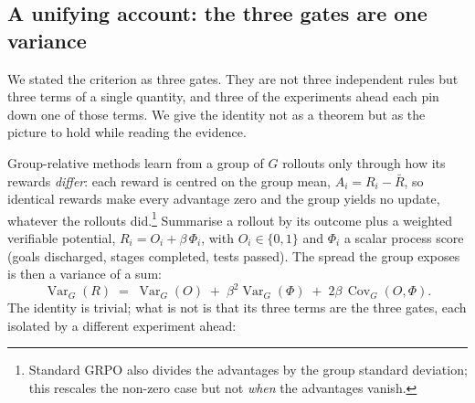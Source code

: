 \subsection{A unifying account: the three gates are one variance}
\label{sec:unifying}

We stated the criterion as three gates. They are not three independent rules but three terms
of a single quantity, and three of the experiments ahead each pin down one of those terms. We
give the identity not as a theorem but as the picture to hold while reading the evidence.

Group-relative methods learn from a group of $G$ rollouts only through how its rewards
\emph{differ}: each reward is centred on the group mean, $A_i = R_i - \bar R$, so identical
rewards make every advantage zero and the group yields no update, whatever the rollouts
did.\footnote{Standard GRPO also divides the advantages by the group standard deviation; this
rescales the non-zero case but not \emph{when} the advantages vanish.} Summarise a rollout by
its outcome plus a weighted verifiable potential, $R_i = O_i + \beta\,\Phi_i$, with
$O_i\in\{0,1\}$ and $\Phi_i$ a scalar process score (goals discharged, stages completed, tests
passed). The spread the group exposes is then a variance of a sum:
\[
  \operatorname{Var}_G(R)\;=\;\operatorname{Var}_G(O)\;+\;\beta^2\operatorname{Var}_G(\Phi)
  \;+\;2\beta\,\operatorname{Cov}_G(O,\Phi).
\]
The identity is trivial; what is not is that its three terms are the three gates, each
isolated by a different experiment ahead:

